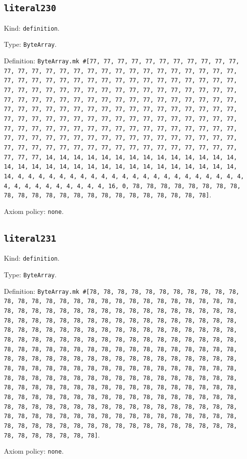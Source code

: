 \documentclass[11pt]{article}
\begin{document}
\subsection*{\texttt{literal230}}
\noindent Kind: \texttt{definition}.\par
\noindent Type: \texttt{ByteArray}.\par
\noindent Definition: \texttt{ByteArray.mk \#[77, 77, 77, 77, 77, 77, 77, 77, 77, 77, 77, 77, 77, 77, 77, 77, 77, 77, 77, 77, 77, 77, 77, 77, 77, 77, 77, 77, 77, 77, 77, 77, 77, 77, 77, 77, 77, 77, 77, 77, 77, 77, 77, 77, 77, 77, 77, 77, 77, 77, 77, 77, 77, 77, 77, 77, 77, 77, 77, 77, 77, 77, 77, 77, 77, 77, 77, 77, 77, 77, 77, 77, 77, 77, 77, 77, 77, 77, 77, 77, 77, 77, 77, 77, 77, 77, 77, 77, 77, 77, 77, 77, 77, 77, 77, 77, 77, 77, 77, 77, 77, 77, 77, 77, 77, 77, 77, 77, 77, 77, 77, 77, 77, 77, 77, 77, 77, 77, 77, 77, 77, 77, 77, 77, 77, 77, 77, 77, 77, 77, 77, 77, 77, 77, 77, 77, 77, 77, 77, 77, 77, 77, 77, 77, 77, 77, 77, 77, 77, 77, 77, 77, 77, 77, 77, 77, 77, 77, 77, 77, 77, 77, 77, 77, 77, 77, 77, 14, 14, 14, 14, 14, 14, 14, 14, 14, 14, 14, 14, 14, 14, 14, 14, 14, 14, 14, 14, 14, 14, 14, 14, 14, 14, 14, 14, 14, 14, 14, 14, 4, 4, 4, 4, 4, 4, 4, 4, 4, 4, 4, 4, 4, 4, 4, 4, 4, 4, 4, 4, 4, 4, 4, 4, 4, 4, 4, 4, 4, 4, 4, 4, 16, 0, 78, 78, 78, 78, 78, 78, 78, 78, 78, 78, 78, 78, 78, 78, 78, 78, 78, 78, 78, 78, 78, 78, 78]}.\par
\noindent Axiom policy: \texttt{none}.\par
\subsection*{\texttt{literal231}}
\noindent Kind: \texttt{definition}.\par
\noindent Type: \texttt{ByteArray}.\par
\noindent Definition: \texttt{ByteArray.mk \#[78, 78, 78, 78, 78, 78, 78, 78, 78, 78, 78, 78, 78, 78, 78, 78, 78, 78, 78, 78, 78, 78, 78, 78, 78, 78, 78, 78, 78, 78, 78, 78, 78, 78, 78, 78, 78, 78, 78, 78, 78, 78, 78, 78, 78, 78, 78, 78, 78, 78, 78, 78, 78, 78, 78, 78, 78, 78, 78, 78, 78, 78, 78, 78, 78, 78, 78, 78, 78, 78, 78, 78, 78, 78, 78, 78, 78, 78, 78, 78, 78, 78, 78, 78, 78, 78, 78, 78, 78, 78, 78, 78, 78, 78, 78, 78, 78, 78, 78, 78, 78, 78, 78, 78, 78, 78, 78, 78, 78, 78, 78, 78, 78, 78, 78, 78, 78, 78, 78, 78, 78, 78, 78, 78, 78, 78, 78, 78, 78, 78, 78, 78, 78, 78, 78, 78, 78, 78, 78, 78, 78, 78, 78, 78, 78, 78, 78, 78, 78, 78, 78, 78, 78, 78, 78, 78, 78, 78, 78, 78, 78, 78, 78, 78, 78, 78, 78, 78, 78, 78, 78, 78, 78, 78, 78, 78, 78, 78, 78, 78, 78, 78, 78, 78, 78, 78, 78, 78, 78, 78, 78, 78, 78, 78, 78, 78, 78, 78, 78, 78, 78, 78, 78, 78, 78, 78, 78, 78, 78, 78, 78, 78, 78, 78, 78, 78, 78, 78, 78, 78, 78, 78, 78, 78, 78, 78, 78, 78, 78, 78, 78, 78, 78, 78, 78, 78, 78, 78, 78, 78, 78, 78, 78, 78, 78, 78, 78, 78, 78, 78, 78, 78, 78, 78, 78, 78]}.\par
\noindent Axiom policy: \texttt{none}.\par
\end{document}
